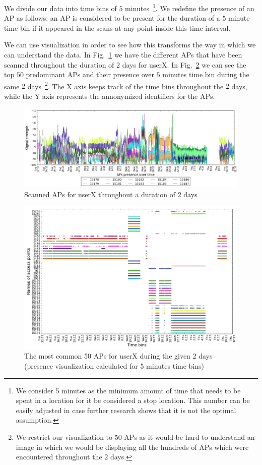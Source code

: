 We divide our data into time bins of $5$ minutes~\footnote{We consider 5 minutes
as the minimum amount of time that needs to be spent in a location for it be
considered a stop location. This number can be easily adjusted in case further
research shows that it is not the optimal assumption.}. We redefine the presence
of an AP as follows: an AP is considered to be present for the duration of a $5$
minute time bin if it appeared in the scans at any point inside this time
interval.

We can use visualization in order to see how this transforms the way in which we
can understand the data. In Fig.~\ref{user_6_APs_2d} we have the different APs
that have been scanned throughout the duration of $2$ days for userX. In
Fig.~\ref{user_6_pres_2d} we can see the top $50$ predominant APs and their
presence over $5$ minutes time bin during the same $2$ days~\footnote{We
restrict our visualization to $50$ APs as it would be hard to understand an
image in which we would be displaying all the hundreds of APs which were
encountered throughout the $2$ days.}. The X axis keeps track of the time bins
throughout the $2$ days, while the Y axis represents the annonymized identifiers
for the APs.

\begin{figure}[!h]
\centering
\includegraphics[width
=\textwidth]{figures/presence/user_6_sorted_2days_plot.png}
\caption{Scanned APs for userX throughout a duration of 2 days}
\label{user_6_APs_2d}
\end{figure}

\begin{figure}[!h]
\centering
\includegraphics[width=1\textwidth]{figures/presence/user_6_sorted_2days_no_rssi_plot.png}
\caption{The most common 50 APs for userX during the given 2 days (presence
visualization calculated for 5 minutes time bins)}
\label{user_6_pres_2d}
\end{figure}

